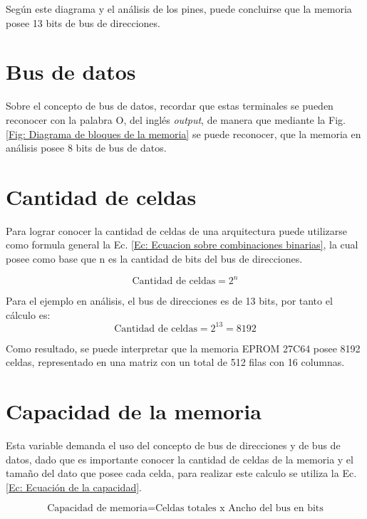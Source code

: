 \documentclass[../Main]{subfiles}
\begin{document}
            Según este diagrama y el análisis de los pines, puede concluirse que la memoria posee 13 bits de bus de direcciones.

        \section{Bus de datos}
            Sobre el concepto de bus de datos, recordar que estas terminales se pueden reconocer con la palabra O, del inglés \textit{output}, de manera que mediante la Fig. \ref{Fig: Diagrama de bloques de la memoria} se puede reconocer, que la memoria en análisis posee 8 bits de bus de datos.

        \section{Cantidad de celdas}
            Para lograr conocer la cantidad de celdas de una arquitectura puede utilizarse como formula general la Ec. \ref{Ec: Ecuacion sobre combinaciones binarias}, la cual posee como base que n es la cantidad de bits del bus de direcciones.

            \begin{equation}
                \text{Cantidad de celdas} = 2^n
                \label{Ec: Ecuacion sobre combinaciones binarias}
            \end{equation}

            Para el ejemplo en análisis, el bus de direcciones es de 13 bits, por tanto el cálculo es:
            \begin{equation}
                \text{Cantidad de celdas} = 2^{13}=8192
            \end{equation}   

            Como resultado, se puede interpretar que la memoria EPROM 27C64 posee 8192 celdas, representado en una matriz con un total de 512 filas con 16 columnas.

        \section{Capacidad de la memoria}
            Esta variable demanda el uso del concepto de bus de direcciones y de bus de datos, dado que es importante conocer la cantidad de celdas de la memoria y el tamaño del dato que posee cada celda, para realizar este calculo se utiliza la Ec. \ref{Ec: Ecuación de la capacidad}.

            \begin{equation}
                \text{Capacidad de memoria}=\text{Celdas totales x Ancho del bus en bits}
                \label{Ec: Ecuación de la capacidad}
            \end{equation}
\end{document}
